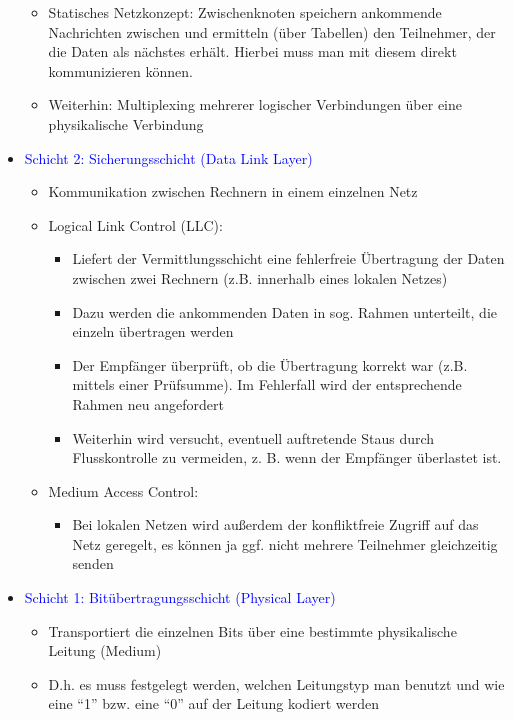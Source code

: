 \begin{itemize}
\begin{itemize}
        \item Statisches Netzkonzept: Zwischenknoten speichern ankommende Nachrichten zwischen und ermitteln (über Tabellen) den Teilnehmer, der die Daten als nächstes erhält. Hierbei muss man mit diesem direkt kommunizieren können.
        \item Weiterhin: Multiplexing mehrerer logischer Verbindungen über eine physikalische Verbindung
    \end{itemize}
    \item \textcolor{blue}{Schicht 2: Sicherungsschicht (Data Link Layer)}
    \begin{itemize}
        \item Kommunikation zwischen Rechnern in einem einzelnen Netz
        \item Logical Link Control (LLC):
        \begin{itemize}
            \item Liefert der Vermittlungsschicht eine fehlerfreie Übertragung der Daten zwischen zwei Rechnern (z.B. innerhalb eines lokalen Netzes)
            \item Dazu werden die ankommenden Daten in sog. Rahmen unterteilt, die einzeln übertragen werden
            \item Der Empfänger überprüft, ob die Übertragung korrekt war (z.B. mittels einer Prüfsumme).
            Im Fehlerfall wird der entsprechende Rahmen neu angefordert
            \item Weiterhin wird versucht, eventuell auftretende Staus durch Flusskontrolle zu vermeiden, z. B. wenn der Empfänger überlastet ist.
        \end{itemize}
        \item Medium Access Control:
        \begin{itemize}
            \item Bei lokalen Netzen wird außerdem der konfliktfreie Zugriff auf das Netz geregelt, es können ja ggf. nicht mehrere Teilnehmer gleichzeitig senden
        \end{itemize}
    \end{itemize}
    \item \textcolor{blue}{Schicht 1: Bitübertragungsschicht (Physical Layer)}
    \begin{itemize}
        \item Transportiert die einzelnen Bits über eine bestimmte physikalische Leitung (Medium)
        \item D.h. es muss festgelegt werden, welchen Leitungstyp man benutzt und wie eine “1” bzw. eine “0” auf der Leitung kodiert werden

\end{itemize}
\end{itemize}
